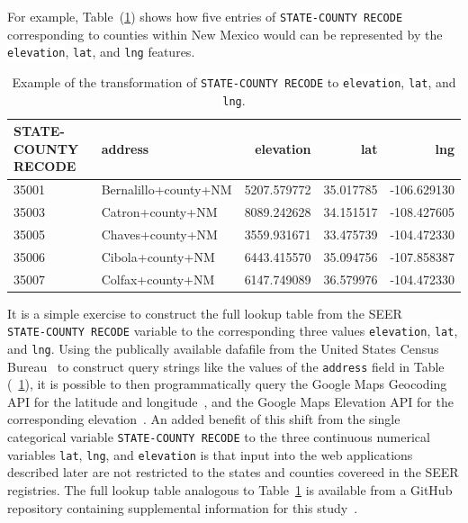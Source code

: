 \documentclass[a4paper,11pt]{article}
\newcommand{\codewhite}[1]{\colorbox{white}{\texttt{#1}}}
\begin{document}
For example, Table~(\ref{tab:nmhead}) shows how five entries of \codewhite{STATE-COUNTY RECODE} corresponding to counties within New Mexico would can be represented by the 
\codewhite{elevation}, \codewhite{lat}, and \codewhite{lng} features.

\begin{table}[tbp]
\begin{center}
\begin{tabular}{llrrr}
\toprule
 STATE-COUNTY RECODE &               address &    elevation &        lat &         lng \\
\midrule
35001 &  Bernalillo+county+NM &  5207.579772 &  35.017785 & -106.629130 \\
35003 &      Catron+county+NM &  8089.242628 &  34.151517 & -108.427605 \\
35005 &      Chaves+county+NM &  3559.931671 &  33.475739 & -104.472330 \\
35006 &      Cibola+county+NM &  6443.415570 &  35.094756 & -107.858387 \\
35007 &      Colfax+county+NM &  6147.749089 &  36.579976 & -104.472330 \\
\bottomrule
\end{tabular}
\caption{\label{tab:nmhead} Example of the transformation of \codewhite{STATE-COUNTY RECODE} to \codewhite{elevation}, \codewhite{lat}, and \codewhite{lng}.}
\end{center}
\end{table}

It is a simple exercise to construct the full lookup table from the SEER \\  \codewhite{STATE-COUNTY RECODE} variable to the corresponding three values \codewhite{elevation}, \codewhite{lat}, and \codewhite{lng}. Using the publically available dafafile from the United States Census Bureau~\cite{census} to construct query strings like the values of the \codewhite{address} field in Table (~\ref{tab:nmhead}), it is possible to then programmatically query the Google Maps Geocoding API for the latitude and longitude~\cite{geocode}, and the Google Maps Elevation API for the corresponding elevation~\cite{elevation}.
An added benefit of this shift from the single categorical variable \codewhite{STATE-COUNTY RECODE} to the three continuous numerical variables \codewhite{lat}, \codewhite{lng}, and \codewhite{elevation} is that input into the web applications described later are not restricted to the states and counties covereed in the SEER registries. The full lookup table analogous to Table~\ref{tab:nmhead} is available from a GitHub repository containing supplemental information for this study~\cite{supp}.
\end{document}
